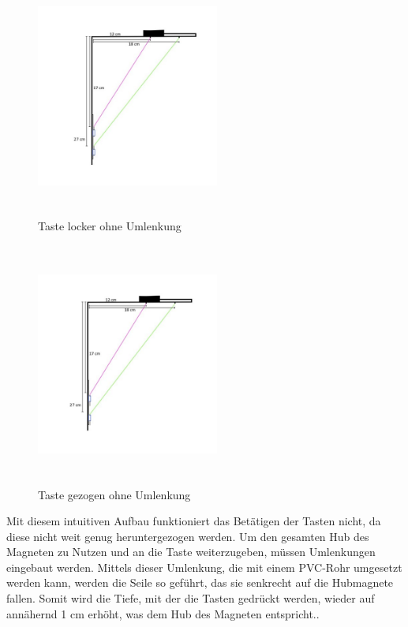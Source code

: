 \begin{figure}[htbp]
	\centering
	\includegraphics[width=6cm, height=8cm]{img/Umlenkung_locker}
	\caption{Taste locker ohne Umlenkung}
	\label{img:Umlenkung_locker}
\end{figure}

\begin{figure}[htbp]
	\centering
	\includegraphics[width=6cm, height=8cm]{img/Umlenkung_gezogen}
	\caption{Taste gezogen ohne Umlenkung}
	\label{img:Umlenkung_gezogen}
\end{figure}

\newpage

Mit diesem intuitiven Aufbau funktioniert das Betätigen der Tasten nicht, da diese nicht weit genug heruntergezogen werden.
Um den gesamten Hub des Magneten zu Nutzen und an die Taste weiterzugeben, müssen Umlenkungen eingebaut werden.
Mittels dieser Umlenkung, die mit einem PVC-Rohr umgesetzt werden kann, werden die Seile so geführt, das sie senkrecht auf die Hubmagnete fallen.
Somit wird die Tiefe, mit der die Tasten gedrückt werden, wieder auf annähernd 1 cm erhöht, was dem Hub des Magneten entspricht..

